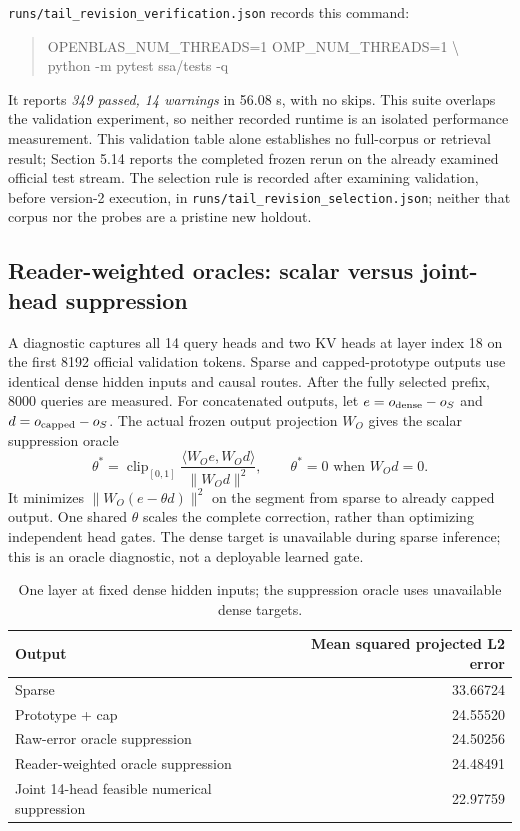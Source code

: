 \documentclass[11pt]{article}
\numberwithin{equation}{section}
\newcommand{\inner}[2]{\langle #1, #2\rangle}
\begin{document}
\nolinkurl{runs/tail_revision_verification.json} records this command:
\begin{quote}\small\ttfamily\raggedright
OPENBLAS\_NUM\_THREADS=1 OMP\_NUM\_THREADS=1 \textbackslash{}\\
python -m pytest ssa/tests -q
\end{quote}
It reports \emph{349 passed, 14 warnings} in 56.08 s, with no skips. This suite overlaps the validation experiment,
so neither recorded runtime is an isolated performance measurement. This validation table alone
establishes no full-corpus or retrieval result; Section 5.14 reports the completed frozen rerun on the
already examined official test stream. The selection rule is recorded after examining validation, before
version-2 execution, in \nolinkurl{runs/tail_revision_selection.json}; neither that corpus nor the probes
are a pristine new holdout.

\subsection{Reader-weighted oracles: scalar versus joint-head suppression}

A diagnostic captures all 14 query heads and two KV heads at layer index 18 on the first 8192 official
validation tokens. Sparse and capped-prototype outputs use identical dense hidden inputs and causal
routes. After the fully selected prefix, 8000 queries are measured. For concatenated outputs, let
$e=o_{\rm dense}-o_S$ and $d=o_{\rm capped}-o_S$. The actual frozen output projection $W_O$ gives
the scalar suppression oracle
\begin{equation}
\theta^*=\operatorname{clip}_{[0,1]}
\frac{\inner{W_Oe}{W_Od}}{\|W_Od\|^2},
\qquad \theta^*=0\text{ when }W_Od=0.
\end{equation}
It minimizes $\|W_O(e-\theta d)\|^2$ on the segment from sparse to already capped output. One shared
$\theta$ scales the complete correction, rather than optimizing independent head gates. The dense target
is unavailable during sparse inference; this is an oracle diagnostic, not a deployable learned gate.

\begin{table}[ht]
\centering\small
\begin{tabular}{lr}\toprule
Output & Mean squared projected L2 error\\\midrule
Sparse & 33.66724\\
Prototype + cap & 24.55520\\
Raw-error oracle suppression & 24.50256\\
Reader-weighted oracle suppression & 24.48491\\
Joint 14-head feasible numerical suppression & 22.97759\\\bottomrule
\end{tabular}
\caption{One layer at fixed dense hidden inputs; the suppression oracle uses unavailable dense targets.}
\end{table}
\end{document}
